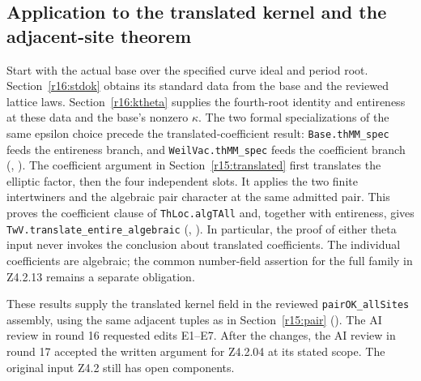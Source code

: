 \subsection{Application to the translated kernel and the adjacent-site theorem}
\label{r16:pair-candidate}
Start with the actual base over the specified curve ideal and period
root. Section~\ref{r16:stdok} obtains its standard data from the
base and the reviewed lattice laws. Section~\ref{r16:ktheta} supplies
the fourth-root identity and entireness at these data and the base's
nonzero $\kappa$. The two formal specializations of the same epsilon
choice precede the translated-coefficient result:
\nolinkurl{Base.thMM_spec} feeds the entireness branch, and
\nolinkurl{WeilVac.thMM_spec} feeds the coefficient branch
(,
).
The coefficient argument in Section~\ref{r15:translated} first
translates the elliptic factor, then the four independent slots. It
applies the two finite intertwiners and the algebraic pair character
at the same admitted pair. This proves the coefficient clause of
\nolinkurl{ThLoc.algTAll} and, together with entireness, gives
\nolinkurl{TwV.translate_entire_algebraic}
(,
).
In particular, the proof of either theta input never invokes the
conclusion about translated coefficients. The individual coefficients
are algebraic; the common number-field assertion for the full family
in Z4.2.13 remains a separate obligation.

These results supply the translated kernel field in the reviewed
\nolinkurl{pairOK_allSites} assembly, using the same adjacent tuples
as in Section~\ref{r15:pair}
().
The AI review in round 16 requested edits E1--E7. After the changes, the AI review in round 17 accepted the written argument for Z4.2.04 at its stated scope.
The original input Z4.2 still has open components.

